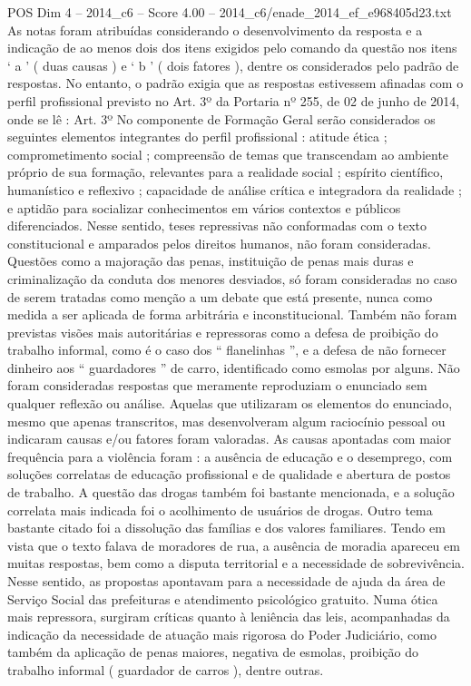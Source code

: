 \begin{textsample}{POS Dim 4 – 2014\_c6 – Score 4.00 – 2014\_c6/enade\_2014\_ef\_e968405d23.txt}
As notas foram atribuídas considerando o desenvolvimento da resposta e a indicação de ao menos dois dos itens exigidos pelo comando da questão nos itens ‘ a ’ ( duas causas ) e ‘ b ’ ( dois fatores ), dentre os considerados pelo padrão de respostas.
No entanto, o padrão exigia que as respostas estivessem afinadas com o perfil profissional previsto no Art. 3º da Portaria nº 255, de 02 de junho de 2014, onde se lê : Art. 3º No componente de Formação Geral serão considerados os seguintes elementos integrantes do perfil profissional : atitude ética ; comprometimento social ; compreensão de temas que transcendam ao ambiente próprio de sua formação, relevantes para a realidade social ; espírito científico, humanístico e reflexivo ; capacidade de análise crítica e integradora da realidade ; e aptidão para socializar conhecimentos em vários contextos e públicos diferenciados.
Nesse sentido, teses repressivas não conformadas com o texto constitucional e amparados pelos direitos humanos, não foram consideradas.
Questões como a majoração das penas, instituição de penas mais duras e criminalização da conduta dos menores desviados, só foram consideradas no caso de serem tratadas como menção a um debate que está presente, nunca como medida a ser aplicada de forma arbitrária e inconstitucional.
Também não foram previstas visões mais autoritárias e repressoras como a defesa de proibição do trabalho informal, como é o caso dos “ flanelinhas ”, e a defesa de não fornecer dinheiro aos “ guardadores ” de carro, identificado como esmolas por alguns.
Não foram consideradas respostas que meramente reproduziam o enunciado sem qualquer reflexão ou análise.
Aquelas que utilizaram os elementos do enunciado, mesmo que apenas transcritos, mas desenvolveram algum raciocínio pessoal ou indicaram causas e/ou fatores foram valoradas.
As causas apontadas com maior frequência para a violência foram : a ausência de educação e o desemprego, com soluções correlatas de educação profissional e de qualidade e abertura de postos de trabalho.
A questão das drogas também foi bastante mencionada, e a solução correlata mais indicada foi o acolhimento de usuários de drogas.
Outro tema bastante citado foi a dissolução das famílias e dos valores familiares.
Tendo em vista que o texto falava de moradores de rua, a ausência de moradia apareceu em muitas respostas, bem como a disputa territorial e a necessidade de sobrevivência.
Nesse sentido, as propostas apontavam para a necessidade de ajuda da área de Serviço Social das prefeituras e atendimento psicológico gratuito.
Numa ótica mais repressora, surgiram críticas quanto à leniência das leis, acompanhadas da indicação da necessidade de atuação mais rigorosa do Poder Judiciário, como também da aplicação de penas maiores, negativa de esmolas, proibição do trabalho informal ( guardador de carros ), dentre outras.

\end{textsample}
